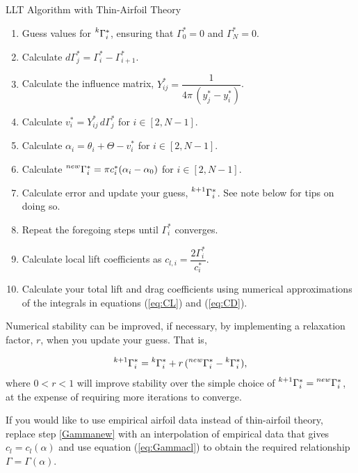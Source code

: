 \documentclass[11pt,letter]{ejlnotes}
\begin{document}
{\begin{callouttitle}{LLT Algorithm with Thin-Airfoil Theory}
				\begin{enumerate}
					\item Guess values for $\prescript{k}{}{\Gamma_i^*}$, ensuring that $\Gamma_0^* = 0$ and $\Gamma_N^* = 0$.
					\item Calculate $d\Gamma_j^* = \Gamma_{i}^* - \Gamma_{i+1}^*$.
					\item Calculate the influence matrix, $Y_{ij}^* = \dfrac{1}{4\pi\,(y_j^* - y_i^*)}$.
					\item Calculate $v_i^* = Y^*_{ij} \, d\Gamma^*_j$ for $i \in [2,N-1]$.
					\item Calculate $\alpha_i = \theta_i + \Theta - v_i^*$ for $i \in [2,N-1]$.
					\item Calculate $\prescript{new}{}\Gamma_i^* = \pi c^*_i (\alpha_i - \alpha_0)$ for $i \in [2,N-1]$. \label{Gammanew}
					\item Calculate error and update your guess, $\prescript{k+1}{}\Gamma_i^*$. See note below for tips on doing so.
					\item Repeat the foregoing steps until $\Gamma_i^*$ converges.
					\item Calculate local lift coefficients as $c_{l,i} = \dfrac{2 \Gamma_i^*}{c_i^*}$.
					\item Calculate your total lift and drag coefficients using numerical approximations of the integrals in equations (\ref{eq:CL}) and (\ref{eq:CD}).
				\end{enumerate}
				
			
			Numerical stability can be improved, if necessary, by implementing a relaxation factor, $r$, when you update your guess.  That is,
			
			\begin{equation}
				\prescript{k+1}{}\Gamma_i^* = \prescript{k}{}\Gamma_i^* + r \, (\prescript{new}{}\Gamma_i^* - \prescript{k}{}\Gamma_i^*), \nonumber
			\end{equation}
			where $0< r < 1$ will improve stability over the simple choice of $\prescript{k+1}{}\Gamma_i^* = \prescript{new}{}\Gamma_i^*$, at the expense of requiring more iterations to converge.
			
			If you would like to use empirical airfoil data instead of thin-airfoil theory, replace step \ref{Gammanew} with an interpolation of empirical data that gives $c_l = c_l(\alpha)$ and use equation (\ref{eq:Gammacl}) to obtain the required relationship $\Gamma = \Gamma(\alpha)$.
				
				
				
		\end{callouttitle}
		
		
		
		

		

		
		
		
		
		


		
	
%	

	}
	
\end{document}
